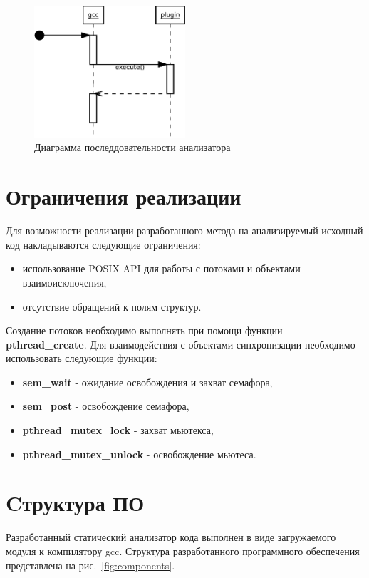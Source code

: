 \begin{figure}
  \centering
  \includegraphics[width=0.5\textwidth]{inc/dia/sequence}
  \caption{Диаграмма последдовательности анализатора}
  \label{fig:sequence}
\end{figure}

\section{Ограничения реализации}

Для возможности реализации разработанного метода на анализируемый исходный код накладываются следующие ограничения:
\begin{itemize}
  \item использование POSIX API для работы с потоками и объектами взаимоисключения,
  \item отсутствие обращений к полям структур.
\end{itemize}

Создание потоков необходимо выполнять при помощи функции \textbf{pthread\_create}. Для взаимодействия с объектами синхронизации необходимо использовать следующие функции:
\begin{itemize}
  \item \textbf{sem\_wait} - ожидание освобождения и захват семафора,
  \item \textbf{sem\_post} - освобождение семафора,
  \item \textbf{pthread\_mutex\_lock} - захват мьютекса,
  \item \textbf{pthread\_mutex\_unlock} - освобождение мьютеса.
\end{itemize}


\section{Cтруктура ПО}

Разработанный статический анализатор кода выполнен в виде загружаемого модуля к компилятору gcc. Структура разработанного программного обеспечения представлена на рис.~\ref{fig:components}.

